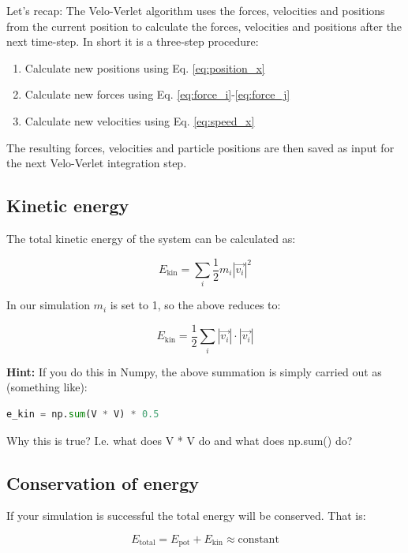 \documentclass{article}
\begin{document}
Let's recap: The Velo-Verlet algorithm uses the forces, velocities and
positions from the current position to calculate the forces, velocities and
positions after the next time-step. In short it is a three-step procedure:

\begin{enumerate}
    \item Calculate new positions using Eq. \ref{eq:position_x}
    \item Calculate new forces using Eq. \ref{eq:force_i}-\ref{eq:force_j}
    \item Calculate new velocities using Eq. \ref{eq:speed_x}
\end{enumerate}

The resulting forces, velocities and particle positions are then saved as input
for the next Velo-Verlet integration step.

\subsection{Kinetic energy}

The total kinetic energy of the system can be calculated as:

\begin{equation}
    E_{\mathrm{kin}} = \sum_i \frac{1}{2} m_i |\vec{v_i}|^2
\end{equation}

In our simulation $m_i$ is set to 1, so the above reduces to:

\begin{equation}
    E_{\mathrm{kin}} = \frac{1}{2} \sum_i |\vec{v_i}| \cdot |\vec{v_i}|
\end{equation}

\textbf{Hint:} If you do this in Numpy, the above summation is simply carried
out as (something like):

\begin{lstlisting}[language=python]
e_kin = np.sum(V * V) * 0.5
\end{lstlisting}

Why this is true? I.e. what does V * V do and what does np.sum() do?

\subsection{Conservation of energy}

If your simulation is successful the total energy will be conserved. That is:

\begin{equation}
    E_{\mathrm{total}} = E_{\mathrm{pot}} + E_{\mathrm{kin}} \approx \mathrm{constant}
\end{equation}
\end{document}
